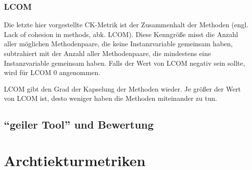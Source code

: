 \documentclass[12pt]{article}
\begin{document}



\subsubsection{LCOM}

Die letzte hier vorgestellte CK-Metrik ist 
der Zusammenhalt der Methoden (engl. Lack of cohesion in methods, abk. LCOM).
Diese Kenngröße misst die Anzahl aller möglichen
Methodenpaare, die keine Instanzvariable gemeinsam haben,
subtrahiert mit der Anzahl aller Methodenpaare, die mindestens
eine Instanzvariable gemeinsam haben. Falls der Wert von LCOM
negativ sein sollte, wird für LCOM 0 angenommen. 


LCOM gibt den Grad der Kapselung der Methoden wieder. Je größer
der Wert von LCOM ist, desto weniger haben die Methoden
miteinander zu tun.

\subsection{``geiler Tool'' und Bewertung}

\section{Archtiekturmetriken}\label{archm}
\end{document}

